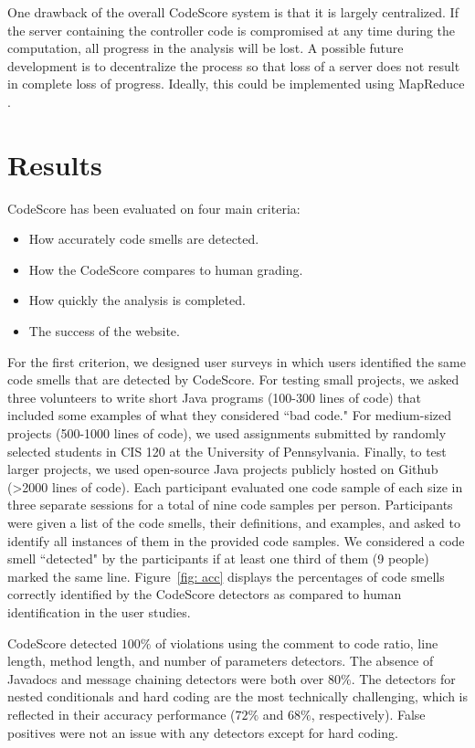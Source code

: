 \documentclass{sig-alternate}
\begin{document}
One drawback of the overall CodeScore system is that it is largely centralized.
If the server containing the controller code is compromised at any time during
the computation, all progress in the analysis will be lost. A possible future development
is to decentralize the process so that loss of a server does
not result in complete loss of progress. Ideally, this could be implemented
using MapReduce \cite{dean2008mapreduce}.

\section{Results}

CodeScore has been evaluated on four main criteria:

\begin{itemize}
	\item How accurately code smells are detected.
	\item How the CodeScore compares to human grading.
	\item How quickly the analysis is completed.
	\item The success of the website.
\end{itemize}

For the first criterion, we designed user surveys in which users identified
the same code smells that are detected by CodeScore. For testing small projects,
we asked three volunteers to write short Java programs (100-300 lines of code) 
that included some examples of what they considered ``bad code." For medium-sized
projects (500-1000 lines of code), we used assignments submitted by
randomly selected students in CIS 120 at the University of Pennsylvania. Finally, to test larger
projects, we used open-source Java projects publicly hosted on Github (>2000
lines of code). Each participant evaluated one
code sample of each size in three separate sessions for a total of nine code
samples per person. Participants were given a list of the code smells, their
definitions, and examples, and asked to identify all instances of them in the
provided code samples. We considered a code smell
``detected" by the participants if at least one third of them (9 people) marked the same
line. Figure~\ref{fig: acc} displays the percentages of code smells correctly
identified by the CodeScore detectors as compared to human identification in the
user studies. 

CodeScore detected $100\%$ of violations using the comment to code ratio, line
length, method length, and number of parameters detectors. The absence of
Javadocs and message chaining detectors were both over $80\%$. The detectors
for nested conditionals and hard coding are the most technically challenging,
which is reflected in their accuracy performance ($72\%$ and $68\%$,
respectively). False positives were not an issue with any detectors except for
hard coding.
\end{document}
